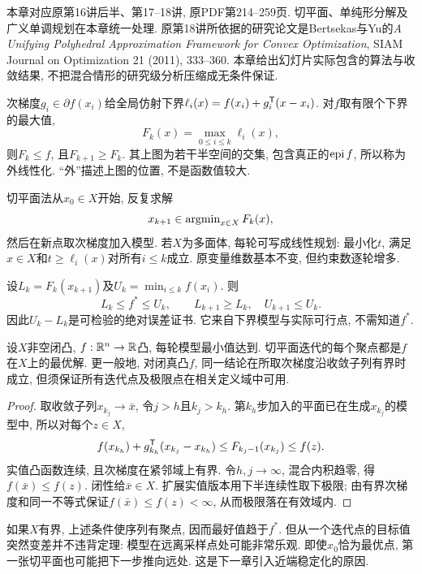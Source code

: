 \label{chap:8}
本章对应原第16讲后半、第17--18讲, 原PDF第214--259页. 切平面、单纯形分解及广义单调规划在本章统一处理. 原第18讲所依据的研究论文是Bertsekas与Yu的\emph{A Unifying Polyhedral Approximation Framework for Convex Optimization}, SIAM Journal on Optimization 21 (2011), 333--360. 本章给出幻灯片实际包含的算法与收敛结果, 不把混合情形的研究级分析压缩成无条件保证.

次梯度$g_i\in\partial f(x_i)$给全局仿射下界$\ell_i(x)=f(x_i)+g_i^{\mathsf T}(x-x_i)$. 对$f$取有限个下界的最大值,
\[
 F_k(x)=\max_{0\le i\le k}\ell_i(x),
\]
则$F_k\le f$, 且$F_{k+1}\ge F_k$. 其上图为若干半空间的交集, 包含真正的$\operatorname{epi} f$, 所以称为外线性化. “外”描述上图的位置, 不是函数值较大.

切平面法从$x_0\in X$开始, 反复求解
\[
 x_{k+1}\in\operatorname{argmin}_{x\in X}F_k(x),
\]
然后在新点取次梯度加入模型. 若$X$为多面体, 每轮可写成线性规划: 最小化$t$, 满足$x\in X$和$t\ge\ell_i(x)$对所有$i\le k$成立. 原变量维数基本不变, 但约束数逐轮增多.

设$L_k=F_k(x_{k+1})$及$U_k=\min_{i\le k}f(x_i)$. 则
\begin{equation}\label{eq:cut-bounds}
 L_k\le f^*\le U_k,\qquad L_{k+1}\ge L_k,\quad U_{k+1}\le U_k.
\end{equation}
因此$U_k-L_k$是可检验的绝对误差证书. 它来自下界模型与实际可行点, 不需知道$f^*$.

\begin{theorem}\label{thm:cutting-convergence}
设$X$非空闭凸, $f:\mathbb R^n\to\mathbb R$凸, 每轮模型最小值达到. 切平面迭代的每个聚点都是$f$在$X$上的最优解. 更一般地, 对闭真凸$f$, 同一结论在所取次梯度沿收敛子列有界时成立, 但须保证所有迭代点及极限点在相关定义域中可用.
\end{theorem}
\begin{proof}
取收敛子列$x_{k_j}\to\bar x$, 令$j>h$且$k_j>k_h$. 第$k_h$步加入的平面已在生成$x_{k_j}$的模型中, 所以对每个$z\in X$,
\[
 f(x_{k_h})+g_{k_h}^{\mathsf T}(x_{k_j}-x_{k_h})
 \le F_{k_j-1}(x_{k_j})\le f(z).
\]
实值凸函数连续, 且次梯度在紧邻域上有界. 令$h,j\to\infty$, 混合内积趋零, 得$f(\bar x)\le f(z)$. 闭性给$\bar x\in X$. 扩展实值版本用下半连续性取下极限; 由有界次梯度和同一不等式保证$f(\bar x)\le f(z)<\infty$, 从而极限落在有效域内.
\end{proof}

如果$X$有界, 上述条件使序列有聚点, 因而最好值趋于$f^*$. 但从一个迭代点的目标值突然变差并不违背定理: 模型在远离采样点处可能非常乐观. 即使$x_0$恰为最优点, 第一张切平面也可能把下一步推向远处. 这是下一章引入近端稳定化的原因.

